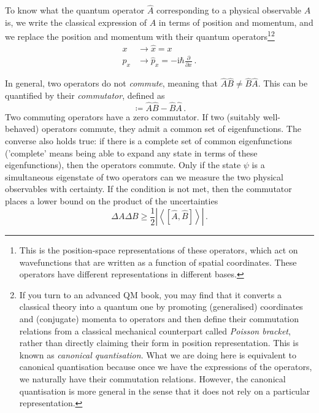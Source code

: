 \documentclass{article}
\theoremstyle{plain}\theoremheaderfont{\normalfont\itshape}\theorembodyfont{\rmfamily}\theoremseparator{.}\newtheorem*{rem}{Remark}\newtheorem*{ex}{Example}\newtheorem*{proof}{Proof}\newtheorem*{altp}{Alternative proof}
\theoremstyle{plain}\theoremheaderfont{\normalfont\bfseries}\theorembodyfont{\rmfamily}\theoremseparator{.}\newtheorem{thm}{Theorem}[section]\newtheorem{lem}[thm]{Lemma}\newtheorem{prop}[thm]{Proposition}\newtheorem*{cor}{Corollary}\newtheorem{defn}[thm]{Definition}\newtheorem{clm}[thm]{Claim}\newtheorem{clminproof}{Claim}
\theoremstyle{break}\theoremheaderfont{\normalfont\itshape}\theorembodyfont{\rmfamily}\theoremseparator{.\medskip}\newtheorem*{proofskip}{Proof}\newtheorem*{exs}{Examples}\newtheorem*{rems}{Remarks}
\theoremstyle{break}\theoremheaderfont{\normalfont\bfseries}\theorembodyfont{\rmfamily}\theoremseparator{.\medskip}\newtheorem{lemskip}[thm]{Lemma}\newtheorem{defnskip}[thm]{Definition}\newtheorem{propskip}[thm]{Proposition}\newtheorem{thmskip}[thm]{Theorem}
\numberwithin{equation}{section}
\newcommand{\ii}{\mathrm{i}}
\newcommand{\pdv}[3][]{\frac{\partial^{#1} #2}{{\partial #3}^{#1}}}
\newcommand{\eval}[1]{\left\langle #1 \right\rangle}
\newcommand{\abs}[1]{\left| #1 \right|}
\begin{document}
    To know what the quantum operator \(\hat{A}\) corresponding to a physical observable \(A\) is, we write the classical expression of \(A\) in terms of position and momentum, and we replace the position and momentum with their quantum operators\footnote{This is the position-space representations of these operators, which act on wavefunctions that are written as a function of spatial coordinates. These operators have different representations in different bases.}\footnote{If you turn to an advanced QM book, you may find that it converts a classical theory into a quantum one by promoting (generalised) coordinates and (conjugate) momenta to operators and then define their commutation relations from a classical mechanical counterpart called \textit{Poisson bracket}, rather than directly claiming their form in position representation. This is known as \textit{canonical quantisation}. What we are doing here is equivalent to canonical quantisation because once we have the expressions of the operators, we naturally have their commutation relations. However, the canonical quantisation is more general in the sense that it does not rely on a particular representation.}
    \begin{align}
        x&\longrightarrow \hat{x}=x\\
        p_x&\longrightarrow \hat{p}_x=-\ii\hbar\pdv{}{x}\,.
    \end{align}

    In general, two operators do not \textit{commute}, meaning that \(\hat{A}\hat{B}\ne\hat{B}\hat{A}\). This can be quantified by their \textit{commutator}, defined as
    \begin{equation}
        [\hat{A},\hat{B}]\coloneqq\hat{A}\hat{B}-\hat{B}\hat{A}\,.
    \end{equation}
    Two commuting operators have a zero commutator. If two (suitably well-behaved) operators commute, they admit a common set of eigenfunctions. The converse also holds true: if there is a complete set of common eigenfunctions ('complete' means being able to expand any state in terms of these eigenfunctions), then the operators commute. Only if the state \(\psi\) is a simultaneous eigenstate of two operators can we measure the two physical observables with certainty. If the condition is not met, then the commutator places a lower bound on the product of the uncertainties
    \begin{equation}
        \Delta A\Delta B\ge\frac{1}{2}\abs{\eval{[\hat{A},\hat{B}]}}\,.
    \end{equation}
\end{document}
